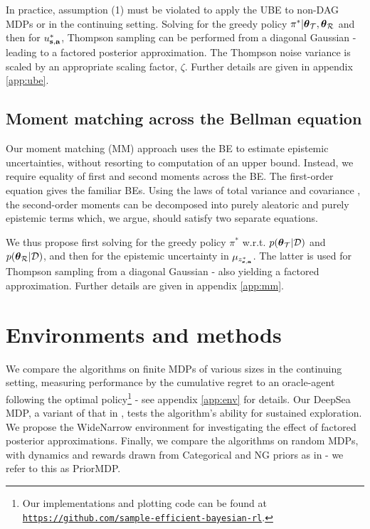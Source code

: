 \documentclass{article}
\begin{document}
In practice, assumption (1) must be violated to apply the UBE to non-DAG MDPs or in the continuing setting. Solving for the greedy policy ${\pi^*} | \boldsymbol{\theta}_{\mathcal{T}}, \boldsymbol{\theta}_{\mathcal{R}}$ and then for $u_{\mathbf{s}, \mathbf{a}}^{*}$, Thompson sampling can be performed from a diagonal Gaussian - leading to a factored posterior approximation. The Thompson noise variance is scaled by an appropriate scaling factor, $\zeta$. Further details are given in appendix \ref{app:ube}.

\subsection{Moment matching across the Bellman equation}

Our moment matching (MM) approach uses the BE to estimate epistemic uncertainties, without resorting to computation of an upper bound. Instead, we require equality of first and second moments across the BE. The first-order equation gives the familiar BEs. Using the laws of total variance and covariance \citep{weiss}, the second-order moments can be decomposed into purely aleatoric and purely epistemic terms which, we argue, should satisfy two separate equations.

We thus propose first solving for the greedy policy $\pi^*$ w.r.t. $p(\boldsymbol{\theta}_{\mathcal{T}} | \mathcal{D})$ and $p(\boldsymbol{\theta}_{\mathcal{R}} | \mathcal{D})$, and then for the epistemic uncertainty in $\mu_{z^*_{\mathbf{s}, \mathbf{a}}}$. The latter is used for Thompson sampling from a diagonal Gaussian - also yielding a factored approximation. Further details are given in appendix \ref{app:mm}.

\section{Environments and methods}

We compare the algorithms on finite MDPs of various sizes in the continuing setting, measuring performance by the cumulative regret to an oracle-agent following the optimal policy\footnote{Our implementations and plotting code can be found at \scriptsize{\texttt{\href{https://github.com/sample-efficient-bayesian-rl/nips-2019-rl-workshop}{https://github.com/sample-efficient-bayesian-rl}}}.} - see appendix \ref{app:env} for details. Our DeepSea MDP, a variant of that in \cite{deepsea}, tests the algorithm's ability for sustained exploration. We propose the WideNarrow environment for investigating the effect of factored posterior approximations. Finally, we compare the algorithms on random MDPs, with dynamics and rewards drawn from Categorical and NG priors as in \cite{psrl} - we refer to this as PriorMDP.
\end{document}
